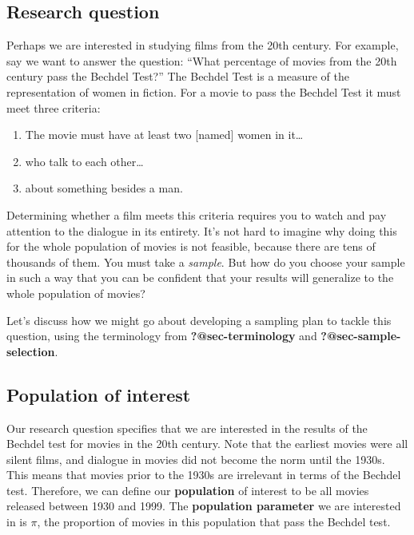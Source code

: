 \documentclass[
  letterpaper,
  DIV=11,
  numbers=noendperiod]{scrreprt}
\providecommand{\tightlist}{%
  \setlength{\itemsep}{0pt}\setlength{\parskip}{0pt}}\usepackage{longtable,booktabs,array}
\theoremstyle{definition}
\theoremstyle{remark}
\begin{document}
\hypertarget{research-question}{%
\subsection{Research question}\label{research-question}}

Perhaps we are interested in studying films from the 20th century. For
example, say we want to answer the question: ``What percentage of movies
from the 20th century pass the Bechdel Test?'' The Bechdel Test is a
measure of the representation of women in fiction. For a movie to pass
the Bechdel Test it must meet three criteria:

\begin{enumerate}
\def\labelenumi{\arabic{enumi}.}
\tightlist
\item
  The movie must have at least two {[}named{]} women in it\ldots{}
\item
  who talk to each other\ldots{}
\item
  about something besides a man.
\end{enumerate}

Determining whether a film meets this criteria requires you to watch and
pay attention to the dialogue in its entirety. It's not hard to imagine
why doing this for the whole population of movies is not feasible,
because there are tens of thousands of them. You must take a
\emph{sample}. But how do you choose your sample in such a way that you
can be confident that your results will generalize to the whole
population of movies?

Let's discuss how we might go about developing a sampling plan to tackle
this question, using the terminology from \textbf{?@sec-terminology} and
\textbf{?@sec-sample-selection}.

\hypertarget{population-of-interest}{%
\subsection{Population of interest}\label{population-of-interest}}

Our research question specifies that we are interested in the results of
the Bechdel test for movies in the 20th century. Note that the earliest
movies were all silent films, and dialogue in movies did not become the
norm until the 1930s. This means that movies prior to the 1930s are
irrelevant in terms of the Bechdel test. Therefore, we can define our
\textbf{population} of interest to be all movies released between 1930
and 1999. The \textbf{population parameter} we are interested in is
\(\pi\), the proportion of movies in this population that pass the
Bechdel test.
\end{document}

